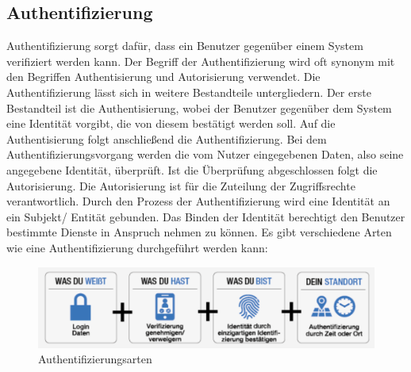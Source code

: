 \documentclass[utf8,biblatex]{lni}
\begin{document}
\subsection{Authentifizierung}

Authentifizierung sorgt dafür, dass ein Benutzer gegenüber einem System verifiziert werden kann.
Der Begriff der Authentifizierung wird oft synonym mit den Begriffen Authentisierung und Autorisierung verwendet. 
Die Authentifizierung lässt sich in weitere Bestandteile untergliedern. Der erste Bestandteil ist die Authentisierung, 
wobei der Benutzer gegenüber dem System eine Identität vorgibt, die von diesem bestätigt werden soll. 
Auf die Authentisierung folgt anschließend die Authentifizierung. Bei dem Authentifizierungsvorgang werden die vom Nutzer 
eingegebenen Daten, also seine angegebene Identität, überprüft. Ist die Überprüfung abgeschlossen folgt die 
Autorisierung. Die Autorisierung ist für die Zuteilung der Zugriffsrechte verantwortlich. 
Durch den Prozess der Authentifizierung wird eine Identität an ein Subjekt/ Entität gebunden. 
Das Binden der Identität berechtigt den Benutzer bestimmte Dienste in Anspruch nehmen zu können. 
\newline
Es gibt verschiedene Arten wie eine Authentifizierung durchgeführt werden kann:
\begin{figure}
    \centering
    \includegraphics[width=\textwidth]{images/authent_pos1.png}
    \caption[Authentifizierungsarten]{Authentifizierungsarten} 
    \label{Authentifizierungsarten}
\end{figure} 
\end{document}
